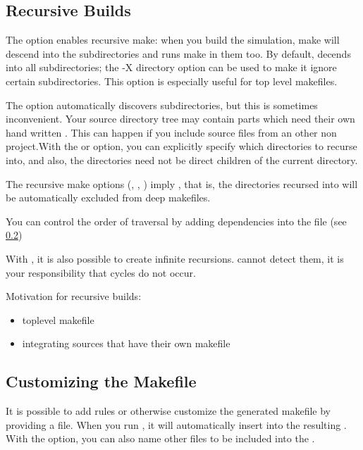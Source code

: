 \subsection{Recursive Builds}


The  option enables recursive make: when you build the simulation, make
will descend into the subdirectories and runs make in them too.
By default,  decends into all subdirectories; the -X directory option
can be used to make it ignore certain subdirectories. This option is especially useful
for top level makefiles.


The  option automatically discovers subdirectories, but this
is sometimes inconvenient. Your source directory tree may contain
parts which need their own hand written . This can happen if
you include source files from an other non {\opp} project.With the 
or  option, you can explicitly specify which directories to
recurse into, and also, the directories need not be direct children of the
current directory.


The recursive make options (, , )
imply , that is, the directories recursed into will be
automatically excluded from deep makefiles.


You can control the order of traversal by adding dependencies into
the  file (see \ref{sec:makefrag})

\begin{note}
With , it is also possible to create infinite recursions.
 cannot detect them, it is your responsibility that
cycles do not occur.
\end{note}


Motivation for recursive builds:
\begin{itemize}
 \item{toplevel makefile}
 \item{integrating sources that have their own makefile}
\end{itemize}


\subsection{Customizing the Makefile}
\label{sec:makefrag}

It is possible to add rules or otherwise customize the generated makefile
by providing a  file. When you run , it
will automatically insert  into the resulting .
With the  option, you can also name other files to be included into the
.

